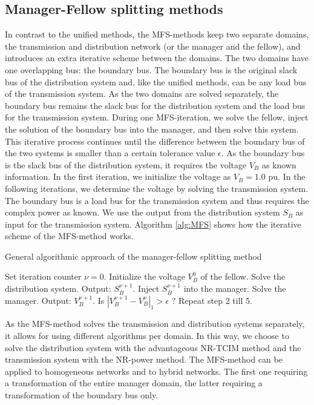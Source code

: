 \documentclass[10pt,journal]{article}
\begin{document}
\subsection{Manager-Fellow splitting methods}
In contrast to the unified methods, the MFS-methods keep two separate domains, the transmission and distribution network (or the manager and the fellow), and introduces an extra iterative scheme between the domains. The two domains have one overlapping bus: the boundary bus. The boundary bus is the original slack bus of the distribution system and, like the unified methods, can be any load bus of the transmission system. As the two domains are solved separately, the boundary bus remains the slack bus for the distribution system and the load bus for the transmission system. During one MFS-iteration, we solve the fellow, inject the solution of the boundary bus into the manager, and then solve this system. This iterative process continues until the difference between the boundary bus of the two systems is smaller than a certain tolerance value $\epsilon$. As the boundary bus is the slack bus of the distribution system, it requires the voltage $V_B$ as known information. In the first iteration, we initialize the voltage as $V_B=1.0$ pu. In the following iterations, we determine the voltage by solving the transmission system. The boundary bus is a load bus for the transmission system and thus requires the complex power as known. We use the output from the distribution system $S_B$ as input for the transmission system. Algorithm \ref{alg:MFS} shows how the iterative scheme of the MFS-method works.     
\begin{algorithm}
    \caption{General algorithmic approach of the manager-fellow splitting method}
        \label{alg:MFS}
\begin{algorithmic}[1]
        \State Set iteration counter $\nu=0$. Initialize the voltage $V_B^0$ of the fellow.
        \State Solve the distribution system. Output: $S_B^{\nu+1}$.
        \State Inject $S_B^{\nu+1}$ into the manager.
        \State Solve the manager. Output: $V_B^{\nu+1}$.
        \State Is $|V_B^{\nu+1}-V_B^{\nu}|_1 >  \epsilon $ ?  Repeat step 2 till 5.
    \end{algorithmic}
\end{algorithm}
As the MFS-method solves the transmission and distribution systems separately, it allows for using different algorithms per domain. In this way, we choose to solve the distribution system with the advantageous NR-TCIM method and the transmission system with the NR-power method.     \newline\newline
The MFS-method can be applied to homogeneous networks and to hybrid networks. The first one requiring a transformation of the entire manager domain, the latter requiring a transformation of the boundary bus only. 
\end{document}
